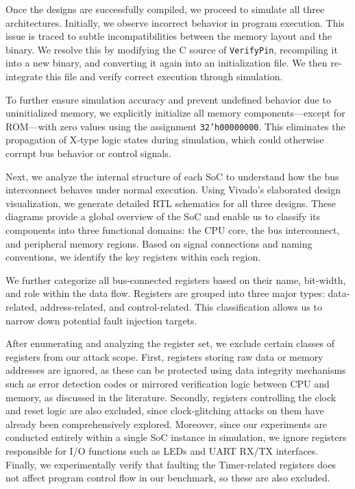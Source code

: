 Once the designs are successfully compiled, we proceed to simulate all three architectures. Initially, we observe incorrect behavior in program execution. This issue is traced to subtle incompatibilities between the memory layout and the binary. We resolve this by modifying the C source of \texttt{VerifyPin}, recompiling it into a new binary, and converting it again into an initialization file. We then re-integrate this file and verify correct execution through simulation.

To further ensure simulation accuracy and prevent undefined behavior due to uninitialized memory, we explicitly initialize all memory components—except for ROM—with zero values using the assignment \texttt{32'h00000000}. This eliminates the propagation of X-type logic states during simulation, which could otherwise corrupt bus behavior or control signals.

Next, we analyze the internal structure of each SoC to understand how the bus interconnect behaves under normal execution. Using Vivado's elaborated design visualization, we generate detailed RTL schematics for all three designs. These diagrams provide a global overview of the SoC and enable us to classify its components into three functional domains: the CPU core, the bus interconnect, and peripheral memory regions. Based on signal connections and naming conventions, we identify the key registers within each region.

We further categorize all bus-connected registers based on their name, bit-width, and role within the data flow. Registers are grouped into three major types: data-related, address-related, and control-related. This classification allows us to narrow down potential fault injection targets.

After enumerating and analyzing the register set, we exclude certain classes of registers from our attack scope. First, registers storing raw data or memory addresses are ignored, as these can be protected using data integrity mechanisms such as error detection codes or mirrored verification logic between CPU and memory, as discussed in the literature. Secondly, registers controlling the clock and reset logic are also excluded, since clock-glitching attacks on them have already been comprehensively explored. Moreover, since our experiments are conducted entirely within a single SoC instance in simulation, we ignore registers responsible for I/O functions such as LEDs and UART RX/TX interfaces. Finally, we experimentally verify that faulting the Timer-related registers does not affect program control flow in our benchmark, so these are also excluded.

